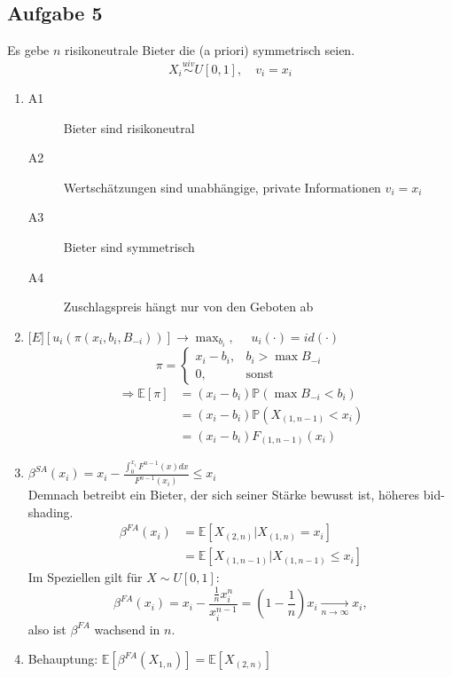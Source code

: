 \documentclass[12pt]{extreport} %
\theoremstyle{named}
\theoremstyle{nnamed}
\theoremstyle{itshape}
\theoremstyle{normal}
\begin{document}
\subsection*{Aufgabe 5}

Es gebe $n$ risikoneutrale Bieter die (a priori) symmetrisch seien.
$$ X_{i} \overset{uiv}{\sim} U[0,1], \quad v_i = x_i $$
\begin{enumerate}
	\item \begin{description}
		\item[A1] Bieter sind risikoneutral
		\item[A2] Wertschätzungen sind unabhängige, private Informationen $v_i = x_i$ 
		\item[A3] Bieter sind symmetrisch
		\item[A4] Zuschlagspreis hängt nur von den Geboten ab
	\end{description}
	\item $\mathds[E]\left[u_i\left(\pi\left(x_i, b_i, B_{-i}\right)\right)\right]  \longrightarrow \max_{b_i}, \quad$ $u_i(\cdot) = id(\cdot)$
		$$ \pi = \begin{cases} x_i - b_i, & b_i > \max B_{-i} \\ 0, & \text{sonst} \end{cases} $$
		\begin{align*}
			\Rightarrow \mathds{E}[\pi] & = (x_i - b_i) \mathds{P}\left(\max B_{-i} < b_i\right) \\
			& = (x_i - b_i) \mathds{P}\left(X_{(1,n-1)} < x_i\right) \\
			& = (x_i - b_i) F_{(1,n-1)}(x_i)
		\end{align*}
	\item $\beta^{SA}(x_i) = x_i - \frac{\int_0^{x_{i}} F^{n-1}(x) dx}{F^{n-1}(x_i)} \leq x_i$ ~\\
		Demnach betreibt ein Bieter, der sich seiner Stärke bewusst ist, höheres bid-shading.
		\begin{align*}
			\beta^{FA}(x_i) & = \mathds{E}\left[ X_{(2,n)} \big| X_{(1,n)} = x_i \right] \\
			& = \mathds{E} \left[ X_{(1,n-1)} \big| X_{(1,n-1)} \leq x_i \right]
		\end{align*}
		Im Speziellen gilt für $X \sim U[0, 1]$:
		$$ \beta^{FA}(x_i) = x_i - \frac{\frac{1}{n} x_i^n}{x_i^{n-1}} = \left( 1 - \frac{1}{n} \right) x_i \xrightarrow[n \rightarrow \infty]{} x_i, $$
		also ist $\beta^{FA}$ wachsend in $n$.
	\item Behauptung: $\mathds{E}\left[ \beta^{FA}(X_{1,n}) \right] = \mathds{E}\left[ X_{(2,n)} \right]$ 

\end{enumerate}
\end{document}
